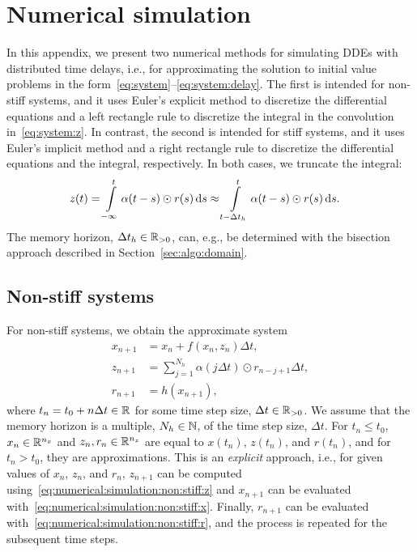 \section{Numerical simulation}\label{sec:numerical:simulation}
In this appendix, we present two numerical methods for simulating DDEs with distributed time delays, i.e., for approximating the solution to initial value problems in the form~\eqref{eq:system}--\eqref{eq:system:delay}. The first is intended for non-stiff systems, and it uses Euler's explicit method to discretize the differential equations and a left rectangle rule to discretize the integral in the convolution in~\eqref{eq:system:z}. In contrast, the second is intended for stiff systems, and it uses Euler's implicit method and a right rectangle rule to discretize the differential equations and the integral, respectively. In both cases, we truncate the integral:
%
\begin{align}\label{eq:numerical:simulation:system:z}
	z(t) &= \int\limits_{-\infty}^t \alpha(t - s) \odot r(s) \,\mathrm{d} s \approx \int\limits_{t - \Delta t_h}^t \alpha(t - s) \odot r(s) \,\mathrm{d} s.
\end{align}
%
The memory horizon, $\Delta t_h \in \mathbb{R}_{> 0}$, can, e.g., be determined with the bisection approach described in Section~\ref{sec:algo:domain}.

\subsection{Non-stiff systems}\label{sec:numerical:simulation:non:stiff}
For non-stiff systems, we obtain the approximate system
%
\begin{subequations}\label{eq:numerical:simulation:non:stiff}
	\begin{align}
		\label{eq:numerical:simulation:non:stiff:x}
		x_{n+1} &= x_n + f(x_n, z_n) \Delta t, \\
		\label{eq:numerical:simulation:non:stiff:z}
		z_{n+1} &= \sum_{j=1}^{N_h} \alpha(j \Delta t) \odot r_{n-j+1} \Delta t, \\
		\label{eq:numerical:simulation:non:stiff:r}
		r_{n+1} &= h(x_{n+1}),
	\end{align}
\end{subequations}
%
where $t_n = t_0 + n \Delta t \in \mathbb{R}$ for some time step size, $\Delta t \in \mathbb{R}_{> 0}$. We assume that the memory horizon is a multiple, $N_h \in \mathbb{N}$, of the time step size, $\Delta t$. For $t_n \leq t_0$, $x_n \in \mathbb{R}^{n_x}$ and $z_n, r_n \in \mathbb{R}^{n_z}$ are equal to $x(t_n)$, $z(t_n)$, and $r(t_n)$, and for $t_n > t_0$, they are approximations. This is an \emph{explicit} approach, i.e., for given values of $x_n$, $z_n$, and $r_n$, $z_{n+1}$ can be computed using~\eqref{eq:numerical:simulation:non:stiff:z} and $x_{n+1}$ can be evaluated with~\eqref{eq:numerical:simulation:non:stiff:x}. Finally, $r_{n+1}$ can be evaluated with~\eqref{eq:numerical:simulation:non:stiff:r}, and the process is repeated for the subsequent time steps.

